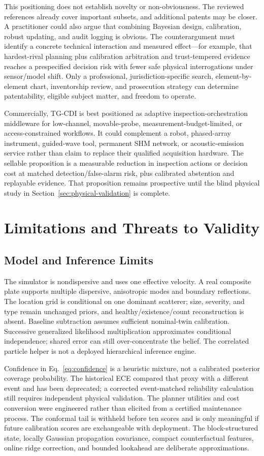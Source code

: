\documentclass[conference]{IEEEtran}
\begin{document}
This positioning does not establish novelty or non-obviousness. The reviewed references already cover important subsets, and additional patents may be closer. A practitioner could also argue that combining Bayesian design, calibration, robust updating, and audit logging is obvious. The counterargument must identify a concrete technical interaction and measured effect---for example, that hardest-rival planning plus calibration arbitration and trust-tempered evidence reaches a prespecified decision risk with fewer safe physical interrogations under sensor/model shift. Only a professional, jurisdiction-specific search, element-by-element chart, inventorship review, and prosecution strategy can determine patentability, eligible subject matter, and freedom to operate.

Commercially, TG-CDI is best positioned as adaptive inspection-orchestration middleware for low-channel, movable-probe, measurement-budget-limited, or access-constrained workflows. It could complement a robot, phased-array instrument, guided-wave tool, permanent SHM network, or acoustic-emission service rather than claim to replace their qualified acquisition hardware. The sellable proposition is a measurable reduction in inspection actions or decision cost at matched detection/false-alarm risk, plus calibrated abstention and replayable evidence. That proposition remains prospective until the blind physical study in Section~\ref{sec:physical-validation} is complete.

\section{Limitations and Threats to Validity}
\subsection{Model and Inference Limits}
The simulator is nondispersive and uses one effective velocity. A real composite plate supports multiple dispersive, anisotropic modes and boundary reflections. The location grid is conditional on one dominant scatterer; size, severity, and type remain unchanged priors, and healthy/existence/count reconstruction is absent. Baseline subtraction assumes sufficient nominal-twin calibration. Successive generalized likelihood multiplication approximates conditional independence; shared error can still over-concentrate the belief. The correlated particle helper is not a deployed hierarchical inference engine.

Confidence in Eq.~\eqref{eq:confidence} is a heuristic mixture, not a calibrated posterior coverage probability. The historical ECE compared that proxy with a different event and has been deprecated; a corrected event-matched reliability calculation still requires independent physical validation. The planner utilities and cost conversion were engineered rather than elicited from a certified maintenance process. The conformal tail is withheld before ten scores and is only meaningful if future calibration scores are exchangeable with deployment. The block-structured state, locally Gaussian propagation covariance, compact counterfactual features, online ridge correction, and bounded lookahead are deliberate approximations.
\end{document}
